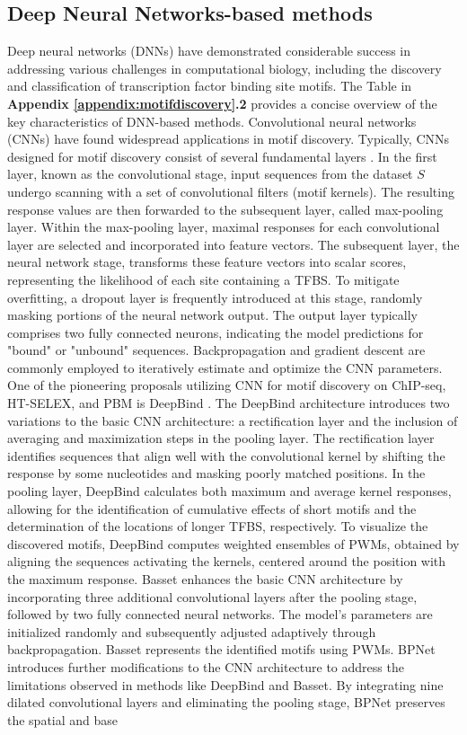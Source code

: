\documentclass[a4paper, titlepage, openright]{book}
\begin{document}
\subsection{Deep Neural Networks-based methods}
Deep neural networks (DNNs) have demonstrated considerable success in addressing various challenges in computational biology, including the discovery and classification of transcription factor binding site motifs. The Table in \textbf{Appendix \ref{appendix:motifdiscovery}.2} provides a concise overview of the key characteristics of DNN-based methods. Convolutional neural networks (CNNs) \citep{lecun2015deep} have found widespread applications in motif discovery. Typically, CNNs designed for motif discovery consist of several fundamental layers \citep{zeng2016convolutional}. In the first layer, known as the convolutional stage, input sequences from the dataset $S$ undergo scanning with a set of convolutional filters (motif kernels). The resulting response values are then forwarded to the subsequent layer, called max-pooling layer. Within the max-pooling layer, maximal responses for each convolutional layer are selected and incorporated into feature vectors. The subsequent layer, the neural network stage, transforms these feature vectors into scalar scores, representing the likelihood of each site containing a TFBS. To mitigate overfitting, a dropout layer is frequently introduced at this stage, randomly masking portions of the neural network output. The output layer typically comprises two fully connected neurons, indicating the model predictions for "bound" or "unbound" sequences. Backpropagation and gradient descent are commonly employed to iteratively estimate and optimize the CNN parameters. One of the pioneering proposals utilizing CNN for motif discovery on ChIP-seq, HT-SELEX, and PBM is DeepBind \citep{alipanahi2015predicting}. The DeepBind architecture introduces two variations to the basic CNN architecture: a rectification layer and the inclusion of averaging and maximization steps in the pooling layer. The rectification layer identifies sequences that align well with the convolutional kernel by shifting the response by some nucleotides and masking poorly matched positions. In the pooling layer, DeepBind calculates both maximum and average kernel responses, allowing for the identification of cumulative effects of short motifs and the determination of the locations of longer TFBS, respectively. To visualize the discovered motifs, DeepBind computes weighted ensembles of PWMs, obtained by aligning the sequences activating the kernels, centered around the position with the maximum response. Basset \citep{kelley2016basset} enhances the basic CNN architecture by incorporating three additional convolutional layers after the pooling stage, followed by two fully connected neural networks. The model's parameters are initialized randomly and subsequently adjusted adaptively through backpropagation. Basset represents the identified motifs using PWMs. BPNet \citep{avsec2021base} introduces further modifications to the CNN architecture to address the limitations observed in methods like DeepBind and Basset. By integrating nine dilated convolutional layers and eliminating the pooling stage, BPNet preserves the spatial and base 
\end{document}
